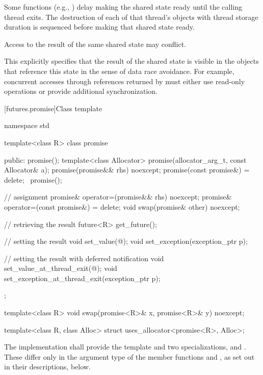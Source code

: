 \pnum
Some functions (e.g., ) delay making
the shared state ready until the calling thread exits. The destruction of
each of that thread's objects with thread storage duration
is sequenced before making that shared state ready.

\pnum
Access to the result of the same shared state may conflict.
\begin{note}
This explicitly specifies that the result of the shared state is
visible in the objects that reference this state in the sense of data race
avoidance. For example, concurrent accesses through
references returned by 
must either use read-only operations or provide additional synchronization.
\end{note}

[futures.promise]{Class template }

%
\begin{codeblock}
namespace std {
  template<class R>
  class promise {
  public:
    promise();
    template<class Allocator>
      promise(allocator_arg_t, const Allocator& a);
    promise(promise&& rhs) noexcept;
    promise(const promise&) = delete;
    ~promise();

    // assignment
    promise& operator=(promise&& rhs) noexcept;
    promise& operator=(const promise&) = delete;
    void swap(promise& other) noexcept;

    // retrieving the result
    future<R> get_future();

    // setting the result
    void set_value(@\seebelow@);
    void set_exception(exception_ptr p);

    // setting the result with deferred notification
    void set_value_at_thread_exit(@\seebelow@);
    void set_exception_at_thread_exit(exception_ptr p);
  };

  template<class R>
    void swap(promise<R>& x, promise<R>& y) noexcept;

  template<class R, class Alloc>
    struct uses_allocator<promise<R>, Alloc>;
}
\end{codeblock}

\pnum
The implementation shall provide the template  and two specializations,
 and . These differ only in the argument type
of the member functions  and ,
as set out in their descriptions, below.

